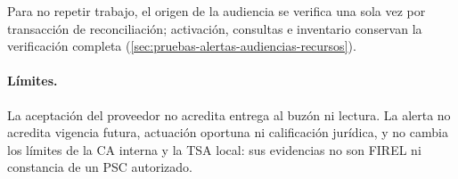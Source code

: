 Para no repetir trabajo, el origen de la audiencia se verifica una sola vez por transacción de reconciliación; activación, consultas e inventario conservan la verificación completa (\cref{sec:pruebas-alertas-audiencias-recursos}).

\paragraph{Límites.} La aceptación del proveedor no acredita entrega al buzón ni lectura. La alerta no acredita vigencia futura, actuación oportuna ni calificación jurídica, y no cambia los límites de la CA interna y la TSA local: sus evidencias no son FIREL ni constancia de un PSC autorizado.

